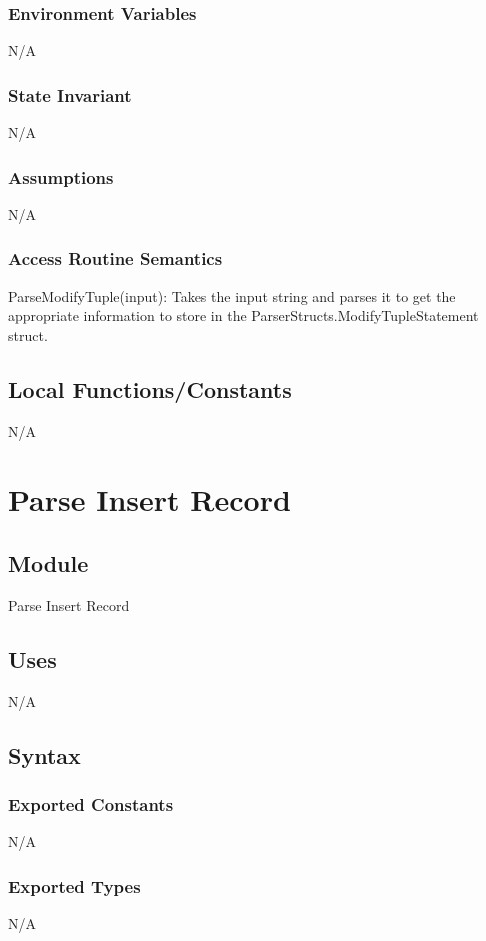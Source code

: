 \documentclass[12pt]{article}
\begin{document}
\subsubsection{Environment Variables}
N/A

\subsubsection{State Invariant}
N/A

\subsubsection{Assumptions}
N/A

\subsubsection{Access Routine Semantics}
{\color{red} \noindent ParseModifyTuple(input): Takes the input string and parses it to get the appropriate information to store in the ParserStructs.ModifyTupleStatement struct.\\}

\subsection{Local Functions/Constants}
N/A

\newpage

\section{Parse Insert Record}

\subsection{Module}
Parse Insert Record

\subsection{Uses}
N/A

\subsection{Syntax}
\subsubsection{Exported Constants}
N/A

\subsubsection{Exported Types}
N/A
\end{document}
